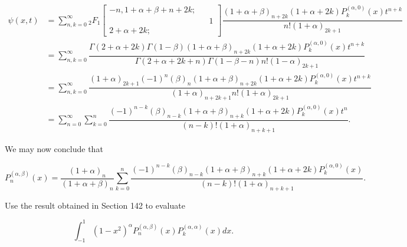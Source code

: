 \begin{solution}
$$\begin{array}{ll}
\psi(x,t) &= \displaystyle\sum_{n,k=0}^{\infty} {}_2F_1 \left[ \begin{array}{rlr} 
-n, 1+\alpha+\beta+n+2k; & & \\
& & 1 \\
2+\alpha+2k; & & 
\end{array} \right] \dfrac{(1+\alpha+\beta)_{n+2k} (1+\alpha+2k)P_k^{(\alpha,0)}(x) t^{n+k}}{n! (1+\alpha)_{2k+1}} \\
&= \displaystyle\sum_{n,k=0}^{\infty} \dfrac{\Gamma(2+\alpha+2k) \Gamma(1-\beta) (1+\alpha+\beta)_{n+2k} (1+\alpha+2k) P_k^{(\alpha,0)}(x) t^{n+k}}{\Gamma(2+\alpha+2k+n) \Gamma(1-\beta-n) n! (1-\alpha)_{2k+1}} \\
&= \displaystyle\sum_{n,k=0}^{\infty} \dfrac{(1+\alpha)_{2k+1}(-1)^n (\beta)_n (1+\alpha+\beta)_{n+2k} (1+\alpha+2k)P_k^{(\alpha,0)}(x) t^{n+k}}{(1+\alpha)_{n+2k+1}n! (1+\alpha)_{2k+1}} \\
&= \displaystyle\sum_{n=0}^{\infty} \displaystyle\sum_{k=0}^n \dfrac{(-1)^{n-k} (\beta)_{n-k} (1+\alpha+\beta)_{n+k} (1+\alpha+2k) P_k^{(\alpha,0)}(x) t^n}{(n-k)! (1+\alpha)_{n+k+1}}.
\end{array}$$

We may now conclude that

$$P_n^{(\alpha,\beta)}(x) = \dfrac{(1+\alpha)_n}{(1+\alpha+\beta)_n} \displaystyle\sum_{k=0}^n \dfrac{(-1)^{n-k} (\beta)_{n-k} (1+\alpha+\beta)_{n+k} (1+\alpha+2k) P_k^{(\alpha,0)}(x)}{(n-k)! (1+\alpha)_{n+k+1}}.$$
\end{solution}
\begin{problem}\label{problem6chapter16}
Use the result obtained in Section 142 to evaluate

$$\displaystyle\int_{-1}^1 (1-x^2)^{\alpha}P_n^{(\alpha,\beta)}(x)P_k^{(\alpha,\alpha)}(x)dx.$$
\end{problem}
